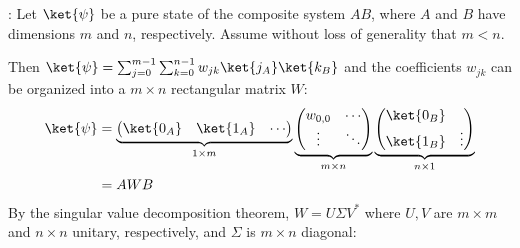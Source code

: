 \par {}: Let $\ket{\psi}$ be a pure state of the composite system $AB$, where $A$ and $B$ have dimensions $m$ and $n$, respectively.
%
Assume without loss of generality that $m < n$.
%
\par Then $\ket{\psi} = \sum_{j = 0}^{m - 1}{\sum_{k = 0}^{n - 1}{w_{jk} \ket{j_A}
\ket{k_B}}}$ and the coefficients $w_{jk}$ can be organized into a $m \times n$ rectangular matrix $W$:
%
\begin{align}
\ket{\psi} &=
\underbrace{\begin{pmatrix} \ket{0_A} & \ket{1_A} & \cdots \end{pmatrix}}_{1 \times m}
\underbrace{\begin{pmatrix} w_{0, 0} & \cdots \\ \vdots & \ddots \end{pmatrix}}_{m \times n}
\underbrace{\begin{pmatrix} \ket{0_B} \\ \ket{1_B} & \vdots \end{pmatrix}}_{n \times 1} \\
&= A W B
\end{align}
%
By the singular value decomposition theorem, $W = U \Sigma V^*$ where $U, V$ are $m \times m$ and $n \times n$ unitary, respectively, and $\Sigma$ is $m \times n$ diagonal:
%
